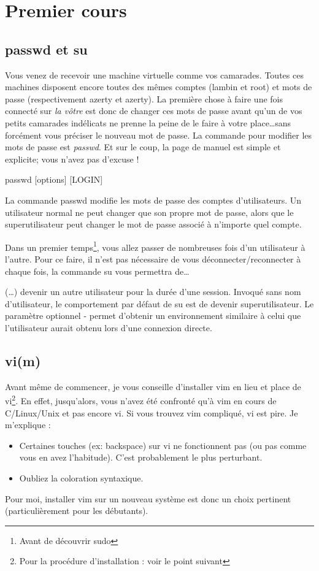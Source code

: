 \documentclass[a4paper,11pt]{article}
\newcommand{\man}[2]{
    \begin{tcolorbox}[toprule=3mm,width=\textwidth,outer arc=0mm,colbacktitle=grayman,coltitle=black,colback={grayman},colframe={grayman},title={man : \tt #1}]
        \tt\raggedright #2
    \end{tcolorbox}
}
\newcommand{\mandesc}[1]{
    \begin{adjustwidth}{0.8cm}{}
        #1
    \end{adjustwidth}
}
\begin{document}
\section{Premier cours}
\subsection{passwd et su}
\par Vous venez de recevoir une machine virtuelle comme vos camarades. Toutes ces machines disposent encore toutes des mêmes comptes (lambin et root) et mots de passe (respectivement azerty et azerty). La première chose à faire une fois connecté sur \emph{la vôtre} est donc de changer ces mots de passe avant qu'un de vos petits camarades indélicats ne prenne la peine de le faire à votre place\ldots sans forcément vous préciser le nouveau mot de passe. La commande pour modifier les mots de passe est \emph{passwd}. Et sur le coup, la page de manuel est simple et explicite; vous n'avez pas d'excuse !
\man{passwd}{
passwd [options] [LOGIN]
\mandesc{La commande passwd modifie les mots de passe des comptes d'utilisateurs. Un utilisateur normal ne peut changer que son propre mot de passe, alors que le superutilisateur peut changer le mot de passe associé à n'importe quel compte.}
}
\par Dans un premier temps\footnote{Avant de découvrir sudo}, vous allez passer de nombreuses fois d'un utilisateur à l'autre. Pour ce faire, il n'est pas nécessaire de vous déconnecter/reconnecter à chaque fois, la commande su vous permettra de\ldots
\man{su}{
(\dots) devenir un autre utilisateur pour la durée d'une session. Invoqué sans nom d'utilisateur, le comportement par défaut de su est de devenir superutilisateur. Le paramètre optionnel - permet d'obtenir un environnement similaire à celui que l'utilisateur aurait obtenu lors d'une connexion directe.}

\subsection{vi(m)}
\par Avant même de commencer, je vous conseille d'installer vim en lieu et place de vi\footnote{Pour la procédure d'installation : voir le point suivant}. En effet, jusqu'alors, vous n'avez été confronté qu'à vim en cours de C/Linux/Unix et pas encore vi. Si vous trouvez vim compliqué, vi est pire. Je m'explique :
\begin{itemize}
    \item Certaines touches (ex: backspace) sur vi ne fonctionnent pas (ou pas comme vous en avez l'habitude). C'est probablement le plus perturbant.
    \item Oubliez la coloration syntaxique.
\end{itemize}
\par Pour moi, installer vim sur un nouveau système est donc un choix pertinent (particulièrement pour les débutants).
\end{document}
